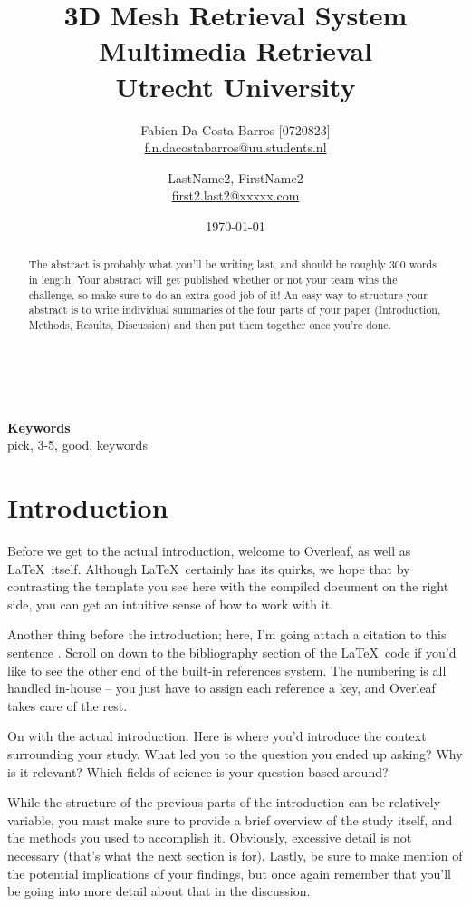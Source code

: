 \documentclass[10pt,twocolumn,letterpaper]{article}
\title{%
  3D Mesh Retrieval System \\
  \large Multimedia Retrieval \\
    Utrecht University}
\author{
  Fabien Da Costa Barros [0720823]\\
  \url{f.n.dacostabarros@uu.students.nl}
  \and
  LastName2, FirstName2\\
  \url{first2.last2@xxxxx.com}
}
\date{\today}
\begin{document}
\maketitle

\begin{abstract}
The abstract is probably what you'll be writing last, and should be roughly 300 words in length. Your abstract will get published whether or not your team wins the challenge, so make sure to do an extra good job of it! An easy way to structure your abstract is to write individual summaries of the four parts of your paper (Introduction, Methods, Results, Discussion) and then put them together once you're done.
\end{abstract} \\ 
\\ 
{\textbf{Keywords} \\
pick, 3-5, good, keywords}

\section{Introduction}
Before we get to the actual introduction, welcome to Overleaf, as well as \LaTeX\ itself. Although \LaTeX\ certainly has its quirks, we hope that by contrasting the template you see here with the compiled document on the right side, you can get an intuitive sense of how to work with it.

Another thing before the introduction; here, I'm going attach a citation to this sentence \cite{a_reference}. Scroll on down to the bibliography section of the \LaTeX\ code if you'd like to see the other end of the built-in references system. The numbering is all handled in-house -- you just have to assign each reference a key, and Overleaf takes care of the rest.

On with the actual introduction. Here is where you'd introduce the context surrounding your study. What led you to the question you ended up asking? Why is it relevant? Which fields of science is your question based around?

While the structure of the previous parts of the introduction can be relatively variable, you must make sure to provide a brief overview of the study itself, and the methods you used to accomplish it. Obviously, excessive detail is not necessary (that's what the next section is for). Lastly, be sure to make mention of the potential implications of your findings, but once again remember that you'll be going into more detail about that in the discussion.
\end{document}
